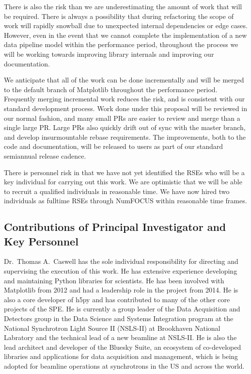 \documentclass[12pt]{article}
\numberwithin{page}{section}
\begin{document}
There is also the risk than we are underestimating the amount of work
that will be required.  There is always a possibility that during
refactoring the scope of work will rapidly snowball due to unexpected
internal dependencies or edge cases.
However, even in the event that we cannot complete the implementation of a new data
pipeline model within the performance period, throughout the process we will be working towards
improving library internals and improving our
documentation.

We anticipate that all of the work can be done incrementally and will
be merged to the default branch of Matplotlib throughout the
performance period.  Frequently merging incremental work reduces the
risk, and is consistent with our standard development process.  Work
done under this proposal will be reviewed in our normal fashion, and many
small PRs are easier to review and merge than a single large PR.
Large PRs also quickly drift out of sync with the master branch, and
develop insurmountable rebase requirements.  The improvements, both to
the code and documentation, will be released to users as part of our
standard semiannual release cadence.

There is personnel risk in that we have not yet identified the RSEs who will be
a key individual for carrying out this work.  We are optimistic that we will be
able to recruit a qualified individuals in reasonable time.  We have now hired
two individuals as fulltime RSEs through NumFOCUS within reasonable time
frames.

\subsection{Contributions of Principal Investigator and Key Personnel}

Dr.\ Thomas A.\ Caswell has the sole individual responsibility for directing
and supervising the execution of this work.  He has extensive experience
developing and maintaining Python libraries for scientists.  He has been
involved with Matplotlib from 2012 and had a leadership role in the project
from 2014.  He is also a core developer of h5py and has contributed to many of
the other core projects of the SPE.  He is currently a group leader of the Data
Acquisition and Detectors group in the Data Science and Systems Integration
program at the National Synchrotron Light Source II (NSLS-II) at Brookhaven
National Labratory and the technical lead of a new beamline at NSLS-II.  He is
also the lead architect and developer of the Bluesky Suite, an ecosystem of
co-developed libraries and applications for data acquisition and management,
which is being adopted for beamline operations at synchrotrons in the US and
across the world.
\end{document}
